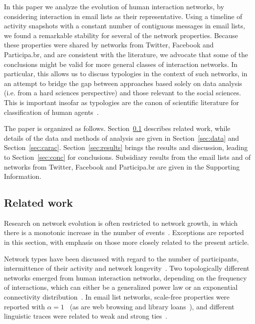 \documentclass[%
	aip,
	jmp,%
	amsmath,amssymb,
	reprint,%
]{revtex4-1}
\begin{document}
In this paper we analyze the evolution of human interaction networks, by considering interaction in email lists as their representative. Using a timeline of activity snapshots with a constant number of contiguous messages in email lists, we found a remarkable stability for several of the network properties. Because these properties were shared by networks from Twitter, Facebook and Participa.br, and are consistent with the literature, we advocate that some of the conclusions might be valid for more general classes of interaction networks. In particular, this allows us to discuss typologies in the context of such networks, in an attempt to bridge the gap between approaches based solely on data analysis (i.e. from a hard sciences perspective) and those relevant to the social sciences. This is important insofar as typologies are the canon of scientific literature for classification of human agents~\cite{typCanon}. 

The paper is organized as follows. Section~\ref{sec:related} describes related work, while details of the data and methods of analysis are given in  Section~\ref{sec:data} and Section~\ref{sec:carac}. Section~\ref{sec:results} brings the results and discussion, leading to Section~\ref{sec:conc} for conclusions.
Subsidiary results from the email lists and of networks from Twitter, Facebook and Participa.br are given in the Supporting Information.

\subsection{Related work}\label{sec:related}
Research on network evolution is often restricted to network growth, in which there is a monotonic increase in the number of events~\cite{barabasiEvo}. Exceptions are reported in this section, with emphasis on those more closely related to the present article.

Network types have been discussed with regard to the number of participants, intermittence of their activity and network longevity~\cite{barabasiEvo}. Two topologically different networks emerged from human interaction networks, depending on the frequency of interactions, which can either be a generalized power law or an exponential connectivity distribution~\cite{barabasiTopologicalEv}. In email list networks, scale-free properties were reported with $\alpha=1$~\cite{bird} (as are web browsing and library loans~\cite{barabasiHumanDyn}), and different linguistic traces were related to weak and strong ties~\cite{GMANE2}.
\end{document}
